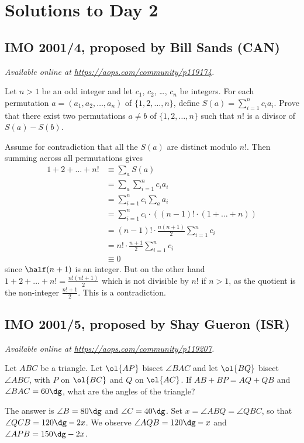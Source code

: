\documentclass[11pt]{scrartcl}
\begin{document}
\section{Solutions to Day 2}
\subsection{IMO 2001/4, proposed by Bill Sands (CAN)}
\textsl{Available online at \url{https://aops.com/community/p119174}.}
\begin{mdframed}[style=mdpurplebox,frametitle={Problem statement}]
Let $n > 1$ be an odd integer and let $c_1$, $c_2$, \dots, $c_n$ be integers.
For each permutation $a = (a_1, a_2, \dots, a_n)$
of $\{1,2,\dots,n\}$, define $S(a) = \sum_{i=1}^n c_i a_i$.
Prove that there exist two permutations $a \neq b$
of $\{1,2,\dots,n\}$ such that $n!$ is a divisor of $S(a)-S(b)$.
\end{mdframed}
Assume for contradiction that all the $S(a)$ are distinct modulo $n!$.
Then summing across all permutations gives
\begin{align*}
  1 + 2 + \dots + n!
  &\equiv \sum_a S(a) \\
  &= \sum_a \sum_{i=1}^n c_i a_i \\
  &= \sum_{i=1}^n c_i \sum_a a_i \\
  &= \sum_{i=1}^n c_i \cdot \left( (n-1)! \cdot (1+\dots+n) \right) \\
  &= (n-1)! \cdot \frac{n(n+1)}{2} \sum_{i=1}^n c_i \\
  &= n! \cdot \frac{n+1}{2} \sum_{i=1}^n c_i \\
  &\equiv 0
\end{align*}
since $\half(n+1)$ is an integer.
But on the other hand
$1 + 2 + \dots + n! = \frac{n!(n!+1)}{2}$
which is not divisible by $n!$ if $n > 1$,
as the quotient is the non-integer $\frac{n!+1}{2}$.
This is a contradiction.
\pagebreak

\subsection{IMO 2001/5, proposed by Shay Gueron (ISR)}
\textsl{Available online at \url{https://aops.com/community/p119207}.}
\begin{mdframed}[style=mdpurplebox,frametitle={Problem statement}]
Let $ABC$ be a triangle.
Let $\ol{AP}$ bisect $\angle BAC$ and let $\ol{BQ}$ bisect $\angle ABC$,
with $P$ on $\ol{BC}$ and $Q$ on $\ol{AC}$.
If $AB + BP = AQ + QB$ and $\angle BAC = 60\dg$,
what are the angles of the triangle?
\end{mdframed}
The answer is $\angle B = 80\dg$ and $\angle C = 40\dg$.
Set $x = \angle ABQ = \angle QBC$, so that $\angle QCB = 120\dg - 2x$.
We observe $\angle AQB = 120\dg - x$ and $\angle APB = 150\dg - 2x$.
\end{document}
